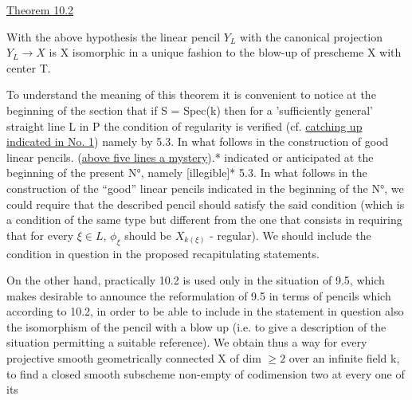 
\uline{Theorem 10.2}

With the above hypothesis the linear pencil $Y_L$ with the
canonical projection $Y_L \rightarrow X$ is X isomorphic in a unique fashion to
the blow-up of prescheme X with center T.

To understand the meaning of this theorem it is convenient to
notice at the beginning of the section that if S = Spec(k) then
for a 'sufficiently general' straight line L in P the condition of
regularity is verified (cf. \uline{catching up indicated in No. 1}) namely
by 5.3.  In what follows in the construction of good linear
pencils.  (\uline{above five lines a mystery}).*
indicated or anticipated at the beginning of the present N°, namely
[illegible]* 5.3.  In what follows in the construction of the
``good'' linear pencils indicated in the beginning of the N°, we
could require that the described pencil should satisfy the said
condition (which is a condition of the same type but different
from the one that consists in requiring that for every $\xi \in L$, $\phi_\xi$
should be $X_{k(\xi)}$ - regular).  We should include the condition in
question in the proposed recapitulating statements.

On the other hand, practically 10.2 is used only in the
situation of 9.5, which makes desirable to announce the
reformulation of 9.5 in terms of pencils which according to 10.2,
in order to be able to include in the statement in question also
the isomorphism of the pencil with a blow up (i.e. to give a
description of the situation permitting a suitable reference).  We
obtain thus a way for every projective smooth geometrically
connected X of dim $\geq 2$ over an infinite field k, to find a closed
smooth subscheme non-empty of codimension two at every one of its

